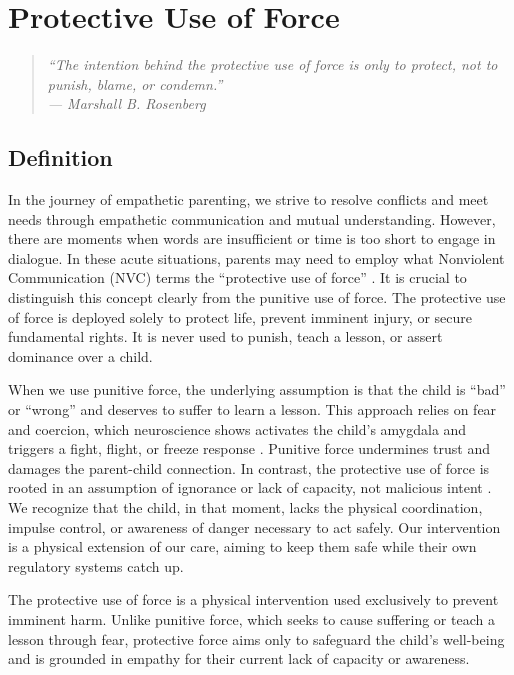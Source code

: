 \chapter{Protective Use of Force}

\begin{quote}
\itshape ``The intention behind the protective use of force is only to protect, not to punish, blame, or condemn.''\\
\upshape --- Marshall B. Rosenberg
\end{quote}

\newpage
\section{Definition}

In the journey of empathetic parenting, we strive to resolve conflicts and meet needs through empathetic communication and mutual understanding. 
However, there are moments when words are insufficient or time is too short to engage in dialogue. 
In these acute situations, parents may need to employ what Nonviolent Communication (NVC) terms the ``protective use of force'' \citep{rosenberg2003}. 
It is crucial to distinguish this concept clearly from the punitive use of force. 
The protective use of force is deployed solely to protect life, prevent imminent injury, or secure fundamental rights. 
It is never used to punish, teach a lesson, or assert dominance over a child.

When we use punitive force, the underlying assumption is that the child is ``bad'' or ``wrong'' and deserves to suffer to learn a lesson. 
This approach relies on fear and coercion, which neuroscience shows activates the child's amygdala and triggers a fight, flight, or freeze response \citep{siegel2011}. 
Punitive force undermines trust and damages the parent-child connection. 
In contrast, the protective use of force is rooted in an assumption of ignorance or lack of capacity, not malicious intent \citep{rosenberg2003}. 
We recognize that the child, in that moment, lacks the physical coordination, impulse control, or awareness of danger necessary to act safely. 
Our intervention is a physical extension of our care, aiming to keep them safe while their own regulatory systems catch up.

\begin{keyinsight}
The protective use of force is a physical intervention used exclusively to prevent imminent harm. 
Unlike punitive force, which seeks to cause suffering or teach a lesson through fear, protective force aims only to safeguard the child's well-being and is grounded in empathy for their current lack of capacity or awareness.
\end{keyinsight}

